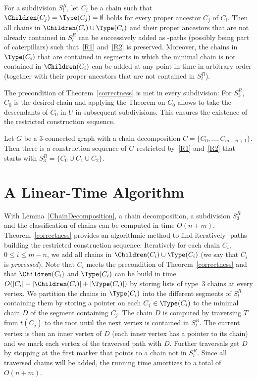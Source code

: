 \begin{theorem}\label{correctness}
For a subdivision $S^R_l$, let $C_i$ be a chain such that $\Children(C_j) = \Type(C_j) = \emptyset$ holds for every proper ancestor $C_j$ of $C_i$. Then all chains in $\Children(C_i) \cup \Type(C_i)$ and their proper ancestors that are not already contained in $S^R_l$ can be successively added as \BG-paths (possibly being part of caterpillars) such that~\ref{R1} and~\ref{R2} is preserved. Moreover, the chains in $\Type(C_i)$ that are contained in segments in which the minimal chain is not contained in $\Children(C_i)$ can be added at any point in time in arbitrary order (together with their proper ancestors that are not contained in $S^R_l$).
\end{theorem}


The precondition of Theorem~\ref{correctness} is met in every subdivision: For $S^R_3$, $C_0$ is the desired chain and applying the Theorem on $C_0$ allows to take the descendants of $C_0$ in $U$ in subsequent subdivisions. This ensures the existence of the restricted construction sequence.

\begin{corollary}\label{correctnessCorollary}
Let $G$ be a $3$-connected graph with a chain decomposition $C = \{C_0,\ldots,C_{m-n+1}\}$. Then there is a construction sequence of $G$ restricted by~\ref{R1} and~\ref{R2} that starts with $S^R_3 = \{C_0 \cup C_1 \cup C_2\}$.
\end{corollary}




\section{A Linear-Time Algorithm}\label{algorithm}
With Lemma~\ref{ChainDecomposition}, a chain decomposition, a subdivision $S^R_3$ and the classification of chains can be computed in time $O(n+m)$. Theorem~\ref{correctness} provides an algorithmic method to find iteratively \BG-paths building the restricted construction sequence: Iteratively for each chain $C_i$, $0 \leq i \leq m-n$, we add all chains in $\Children(C_i) \cup \Type(C_i)$ (we say that $C_i$ is \emph{processed}). Note that $C_i$ meets the precondition of Theorem~\ref{correctness} and that $\Children(C_i)$ and $\Type(C_i)$ can be build in time $O(|C_i|+|\Children(C_i)|+|\Type(C_i)|)$ by storing lists of type~$3$ chains at every vertex. We partition the chains in $\Type(C_i)$ into the different segments of $S^R_l$ containing them by storing a pointer on each $C_j \in \Type(C_i)$ to the minimal chain $D$ of the segment containing $C_j$. The chain $D$ is computed by traversing $T$ from $t(C_j)$ to the root until the next vertex is contained in $S^R_l$. The current vertex is then an inner vertex of $D$ (each inner vertex has a pointer to its chain) and we mark each vertex of the traversed path with $D$. Further traversals get $D$ by stopping at the first marker that points to a chain not in $S^R_l$. Since all traversed chains will be added, the running time amortizes to a total of $O(n+m)$.

